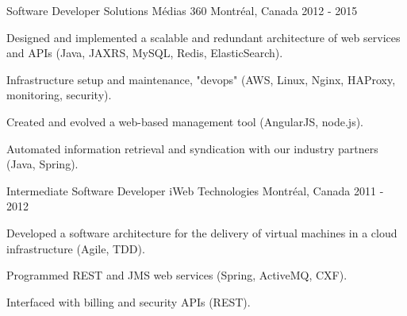 \begin{cventries}
  \cventry
    {Software Developer} %
    {Solutions Médias 360} %
    {Montréal, Canada} %
    {2012 - 2015} %
    {
      \begin{cvitems} %
        \item {Designed and implemented a scalable and redundant architecture of web services and APIs (Java, JAXRS, MySQL, Redis, ElasticSearch).}
        \item {Infrastructure setup and maintenance, "devops" (AWS, Linux, Nginx, HAProxy, monitoring, security).}
        \item {Created and evolved a web-based management tool (AngularJS, node.js).}
        \item {Automated information retrieval and syndication with our industry partners (Java, Spring).}
      \end{cvitems}
    }

  \cventry
    {Intermediate Software Developer} %
    {iWeb Technologies} %
    {Montréal, Canada} %
    {2011 - 2012} %
    {
      \begin{cvitems} %
        \item {Developed a software architecture for the delivery of virtual machines in a cloud infrastructure (Agile, TDD).}
        \item {Programmed REST and JMS web services (Spring, ActiveMQ, CXF).}
        \item {Interfaced with billing and security APIs (REST).}
      \end{cvitems}
    }



\end{cventries}
